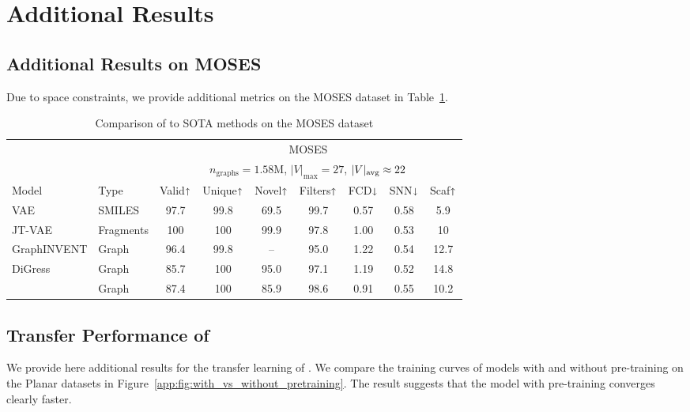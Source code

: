 \section{Additional Results}\label{app:sec:additional_results}

\subsection{Additional Results on MOSES}
Due to space constraints, we provide additional metrics on the MOSES dataset in Table~\ref{app:tab:moses}.

\begin{table}[tbp]
    \centering
    \vskip -0.1in
    \caption{Comparison of {\scriptsize \method{}} to SOTA methods on the MOSES dataset}
    \label{app:tab:moses}
    \begin{small}
    \begin{sc}
    \begin{tabular}{llccccccc}\toprule
         & & \multicolumn{7}{c}{MOSES} \\ %
         & & \multicolumn{7}{c}{$n_{\mathrm{graphs}}= 1.58$M, $|V|_{\max}=27$, $|V|_{\operatorname*{avg}}\approx 22$} \\ \cmidrule{3-9}
        Model & Type & Valid$\shortuparrow$ & Unique$\shortuparrow$ & Novel$\shortuparrow$ & Filters$\shortuparrow$ & FCD$\shortdownarrow$ & SNN$\shortdownarrow$ & Scaf$\shortuparrow$ \\ \midrule
        VAE & SMILES & 97.7 & 99.8 & 69.5 & 99.7 & 0.57 & 0.58 & 5.9 \\
        JT-VAE & Fragments & 100 & 100 & 99.9 & 97.8 & 1.00 & 0.53 & 10 \\
        GraphINVENT & Graph & 96.4 & 99.8 & – & 95.0  & 1.22 & 0.54 & 12.7 \\
        DiGress & Graph & 85.7 & 100 & 95.0 & 97.1 & 1.19 & 0.52 & 14.8 \\ \midrule
        \method{} & Graph & 87.4 & 100 & 85.9 & 98.6 & 0.91 & 0.55 & 10.2  \\
        \bottomrule
    \end{tabular}
    \end{sc}
    \end{small}
    \vskip -0.1in
\end{table}

\subsection{Transfer Performance of \method{}}\label{app:sec:transfer}
We provide here additional results for the transfer learning of \method{}. We compare the training curves of \method{} models with and without pre-training on the Planar datasets in Figure~\ref{app:fig:with_vs_without_pretraining}. The result suggests that the model with pre-training converges clearly faster.

